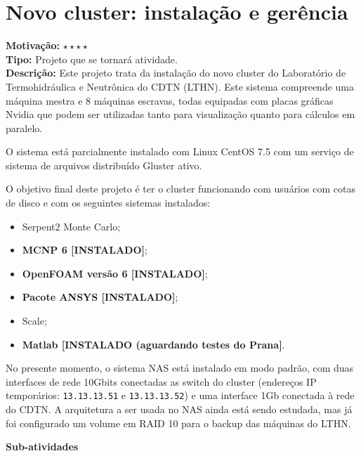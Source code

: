 \chapter{Novo cluster: instalação e gerência}

\textbf{Motivação:} $\star\star\star\star$\\

\textbf{Tipo:} Projeto que se tornará atividade.\\

\textbf{Descrição:} Este projeto trata da instalação do novo cluster do Laboratório 
de Termohidráulica e Neutrônica do CDTN (LTHN). Este sistema compreende uma máquina mestra e 8 máquinas escravas, todas equipadas com placas gráficas Nvidia que podem ser utilizadas tanto para visualização quanto para cálculos em paralelo.

O sistema está parcialmente instalado com Linux CentOS 7.5 com um serviço de 
sistema de arquivos distribuído Gluster ativo. 

O objetivo final deste projeto é ter o cluster funcionando com usuários com cotas 
de disco e com os seguintes sistemas instalados:

\begin{itemize}
	\item Serpent2 Monte Carlo;
	\item \textbf{MCNP 6 [INSTALADO]};
	\item \textbf{OpenFOAM versão 6 [INSTALADO]};
	\item \textbf{Pacote ANSYS [INSTALADO]};
	\item Scale;
	\item \textbf{Matlab [INSTALADO (aguardando testes do Prana]}.
\end{itemize}

No presente momento, o sistema NAS está instalado em modo padrão, com duas 
interfaces de rede 10Gbits conectadas as switch do cluster (endereços IP 
temporários: \texttt{13.13.13.51} e \texttt{13.13.13.52}) e uma interface 
1Gb conectada à rede do CDTN. A arquitetura a ser usada no NAS ainda está sendo 
estudada, mas já foi configurado um volume em RAID 10 para o backup das máquinas 
do LTHN.

\textbf{Sub-atividades}


